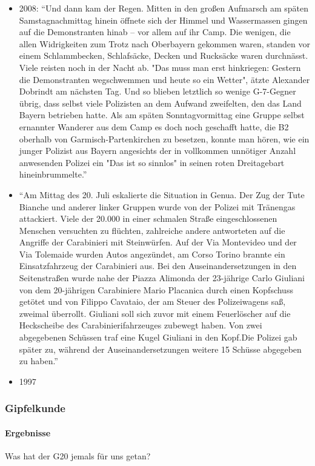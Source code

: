 \documentclass[]{beamer}
\begin{document}
\begin{frame}
{\begin{itemize}
		\item 2008: \enquote{Und dann kam der Regen. Mitten in den großen Aufmarsch am späten Samstagnachmittag hinein öffnete sich der Himmel und Wassermassen gingen auf die Demonstranten hinab – vor allem auf ihr Camp. Die wenigen, die allen Widrigkeiten zum Trotz nach Oberbayern gekommen waren, standen vor einem Schlammbecken, Schlafsäcke, Decken und Rucksäcke waren durchnässt. Viele reisten noch in der Nacht ab. "Das muss man erst hinkriegen: Gestern die Demonstranten wegschwemmen und heute so ein Wetter", ätzte Alexander Dobrindt am nächsten Tag. Und so blieben letztlich so wenige G-7-Gegner übrig, dass selbst viele Polizisten an dem Aufwand zweifelten, den das Land Bayern betrieben hatte. Als am späten Sonntagvormittag eine Gruppe selbst ernannter Wanderer aus dem Camp es doch noch geschafft hatte, die B2 oberhalb von Garmisch-Partenkirchen zu besetzen, konnte man hören, wie ein junger Polizist aus Bayern angesichts der in vollkommen unnötiger Anzahl anwesenden Polizei ein "Das ist so sinnlos" in seinen roten Dreitagebart hineinbrummelte.} \cite{Erk2015}
		\item \enquote{Am Mittag des 20. Juli eskalierte die Situation in Genua. Der Zug der Tute Bianche und anderer linker Gruppen wurde von der Polizei mit Tränengas attackiert. Viele der 20.000 in einer schmalen Straße eingeschlossenen Menschen versuchten zu flüchten, zahlreiche andere antworteten auf die Angriffe der Carabinieri mit Steinwürfen. Auf der Via Montevideo und der Via Tolemaide wurden Autos angezündet, am Corso Torino brannte ein Einsatzfahrzeug der Carabinieri aus. Bei den Auseinandersetzungen in den Seitenstraßen wurde nahe der Piazza Alimonda der 23-jährige Carlo Giuliani von dem 20-jährigen Carabiniere Mario Placanica durch einen Kopfschuss getötet und von Filippo Cavataio, der am Steuer des Polizeiwagens saß, zweimal überrollt. Giuliani soll sich zuvor mit einem Feuerlöscher auf die Heckscheibe des Carabinierifahrzeuges zubewegt haben. Von zwei abgegebenen Schüssen traf eine Kugel Giuliani in den Kopf.Die Polizei gab später zu, während der Auseinandersetzungen weitere 15 Schüsse abgegeben zu haben.} \cite{wiki:g8genua2001} \cite{Matteoni2011}
		\item 1997 \cite{Kubitza2015}
	\end{itemize}}
	\end{frame}

	\begin{frame}
	\frametitle{Gipfelkunde}  \framesubtitle{Ergebnisse}
	Was hat der G20 jemals für uns getan?
\end{frame}
\end{document}
